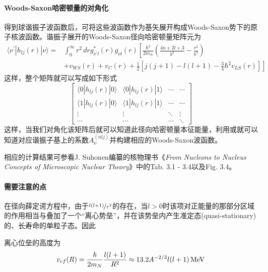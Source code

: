 \paragraph*{Woods-Saxon哈密顿量的对角化}
得到球谐振子波函数后，可将这些波函数作为基矢展开构成Woods-Saxon势下的原子核波函数。谐振子展开的Woods-Saxon径向哈密顿量矩阵元为
\begin{equation}
    \begin{aligned}
		\langle \nu^{\prime} | h_{lj}(r) | \nu\rangle =&\int_{0}^{\infty} r^2 \,dr g_{\nu^{\prime} l}^{\ast}(r) g_{\nu l}(r) \left[ \frac{\hbar^2}{2m_N} \left(\frac{4n + 2l + 3}{b^2} - \frac{r^2}{b^4}\right) \right. \\
		&+ \left. v_{WS}(r) + v_{C}(r) + \frac{1}{2}\left[j(j+1) - l(l+1) - \frac{3}{4}\hbar^2 v_{LS}(r)\right] \right]
    \end{aligned}
\end{equation}
这样，整个矩阵就可以写成如下形式
\begin{equation}
	\begin{bmatrix}
		\langle 0 | h_{lj}(r) | 0 \rangle & \langle 0 | h_{lj}(r) | 1 \rangle & \cdots	& \cdots	\\
		\langle 1 | h_{lj}(r) | 0 \rangle & \langle 1 | h_{lj}(r) | 1 \rangle & \cdots	& \cdots	\\
		\vdots	&	\vdots	& \ddots & \vdots \\
		\cdots	&	\cdots	& \cdots & \ddots
	\end{bmatrix}
\end{equation}
这样，当我们对角化该矩阵后就可以知道此径向哈密顿量本征能量，利用或就可以知道对应谐振子基上的系数$A_{\nu}^{(nlj)}$并构建相应的Woods-Saxon波函数。

相应的计算结果可参看J. Suhonen编纂的核物理书《\textit{From Nucleons to Nucleus Concepts of Microscopic Nuclear Theory}》中的Tab. 3.1 - 3.4以及Fig. 3.4。

\paragraph*{需要注意的点}
在径向薛定谔方程中，由于$\nicefrac{l(l+1)}{r^2}$的存在，当$l>0$时该项对正能量的那部分区域的作用相当与叠加了一个“离心势垒”，并在该势垒内产生准定态(quasi-stationary)的、长寿命的单粒子态。因此

离心位垒的高度为
\begin{equation}
	v_{cf}(R) = \frac{\hbar}{2m_N} \frac{l(l+1)}{R^2} \approx 13.2 A^{-2/3} l(l+1)\, \rm{MeV}
\end{equation}

